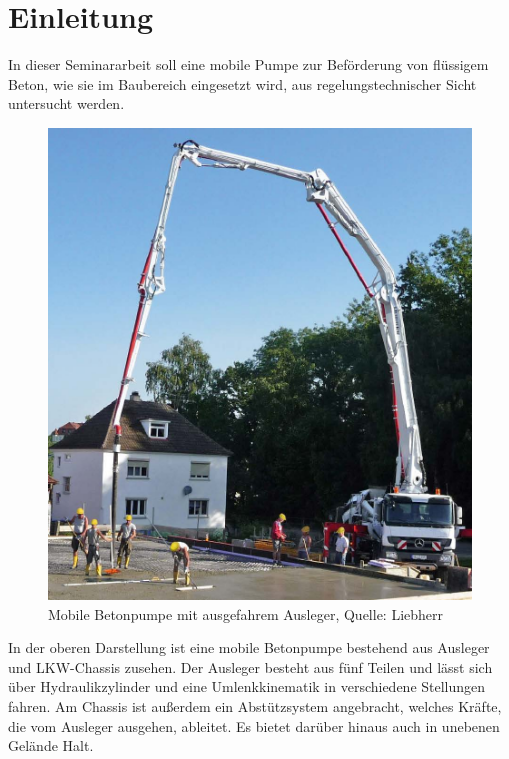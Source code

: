 \chapter{Einleitung}

In dieser Seminararbeit soll eine mobile Pumpe zur Beförderung von flüssigem Beton, wie sie im Baubereich eingesetzt wird, aus regelungstechnischer Sicht untersucht werden.

\begin{figure}[h!]
\centering
\includegraphics[scale=0.6]{betonpumpe.png}
\caption[]{Mobile Betonpumpe mit ausgefahrem Ausleger, Quelle: Liebherr}
\end{figure}

In der oberen Darstellung ist eine mobile Betonpumpe bestehend aus Ausleger und LKW-Chassis zusehen. Der Ausleger besteht aus fünf Teilen und lässt sich über Hydraulikzylinder und eine Umlenkkinematik in verschiedene Stellungen fahren. Am Chassis ist außerdem ein  Abstützsystem angebracht, welches Kräfte, die vom Ausleger ausgehen, ableitet. Es bietet darüber hinaus auch in unebenen Gelände Halt.\\

